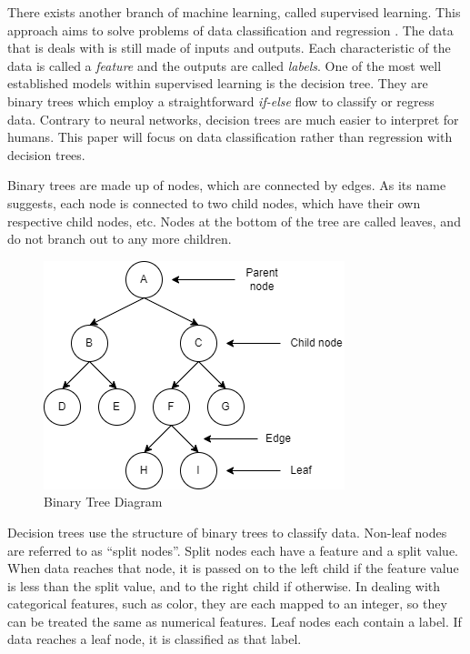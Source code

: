 \documentclass[12pt]{article}
\begin{document}
There exists another branch of machine learning, called supervised learning. This approach aims to solve problems of data classification and regression \cite{Supervised_unsupervised_learning}. The data that is deals with is still made of inputs and outputs. Each characteristic of the data is called a \textit{feature} and the outputs are called \textit{labels}. One of the most well established models within supervised learning is the decision tree. They are binary trees which employ a straightforward \textit{if-else} flow to classify or regress data. Contrary to neural networks, decision trees are much easier to interpret for humans. This paper will focus on data classification rather than regression with decision trees.

Binary trees are made up of nodes, which are connected by edges. As its name suggests, each node is connected to two child nodes, which have their own respective child nodes, etc. Nodes at the bottom of the tree are called leaves, and do not branch out to any more children.

\begin{figure}[H]
    \centering
    \includegraphics[scale=0.6]{figs/binary_tree.png}
    \caption{Binary Tree Diagram}
    \label{fig:binarytree}
\end{figure}

Decision trees use the structure of binary trees to classify data. Non-leaf nodes are referred to as ``split nodes''. Split nodes each have a feature and a split value. When data reaches that node, it is passed on to the left child if the feature value is less than the split value, and to the right child if otherwise. In dealing with categorical features, such as color, they are each mapped to an integer, so they can be treated the same as numerical features. Leaf nodes each contain a label. If data reaches a leaf node, it is classified as that label.
\end{document}
